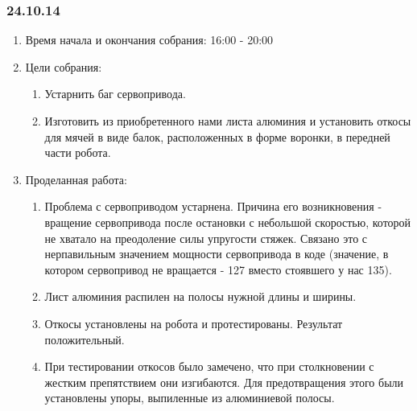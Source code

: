 
\subsubsection{24.10.14}

\begin{enumerate}
	\item Время начала и окончания собрания:
	16:00 - 20:00
	\item Цели собрания:
	\begin{enumerate}
	  \item Устарнить баг сервопривода.
	  
	  \item Изготовить из приобретенного нами листа алюминия и установить откосы для мячей в виде балок, расположенных в форме воронки, в передней части робота.
	  
    \end{enumerate}
    
	\item Проделанная работа:
	\begin{enumerate}
	  \item Проблема с  сервоприводом устарнена. Причина его возникновения - вращение сервопривода после остановки с небольшой скоростью, которой не хватало на преодоление силы упругости стяжек. Связано это с нерпавильным значением мощности сервопривода в коде (значение, в котором сервопривод не вращается - 127 вместо стоявшего у нас 135).
      
      \item Лист алюминия распилен на полосы нужной длины и ширины.
      
      \item Откосы установлены на робота и протестированы. Результат положительный.
      
      \item При тестировании откосов было замечено, что при столкновении с жестким препятствием они изгибаются. Для предотвращения этого были установлены упоры, выпиленные из алюминиевой полосы.
      

\end{enumerate}
\end{enumerate}
